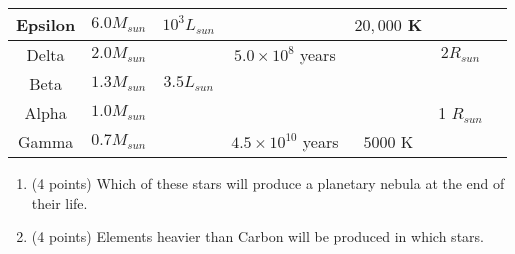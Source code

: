 \documentclass[12pt]{article}
\begin{document}
\begin{enumerate}
\begin{tabular}{|c|c|c|c|c|c|c|}
    Epsilon & $6.0 M_{sun}$ & $10^3 L_{sun}$ & & $20,000$ K & \\
    \hline
    Delta & $2.0M_{sun}$ & & $5.0 \times 10^8$ years & & $2R_{sun}$\\
    \hline
    Beta & $1.3M_{sun}$ & $3.5L_{sun}$ & & & \\
    \hline 
    Alpha & $1.0M_{sun}$ & & & & 1 $R_{sun}$ \\ 
    \hline 
    Gamma & $0.7M_{sun}$ & & $4.5 \times 10^{10}$ years & $5000$ K & \\
    \hline 
\end{tabular}
\begin{enumerate}
    \item (4 points) Which of these stars will produce a planetary nebula at the end of their life. \newline
    \item (4 points) Elements heavier than Carbon will be produced in which stars.
\end{enumerate}
\end{enumerate}
\end{document}
